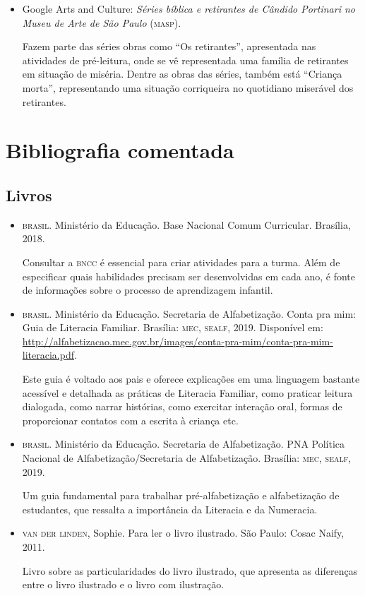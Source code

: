 \documentclass[11pt]{extarticle}
\begin{document}
\begin{itemize}
\item Google Arts and Culture: \textit{Séries bíblica e retirantes de Cândido Portinari no Museu de Arte de São Paulo} (\textsc{masp}).

Fazem parte das séries obras como ``Os retirantes'', apresentada nas atividades de pré-leitura, onde se vê representada
uma família de retirantes em situação de miséria. Dentre as obras das séries, também está ``Criança morta'', representando uma
situação corriqueira no quotidiano miserável dos retirantes. 

\end{itemize}

\section{Bibliografia comentada}

\subsection{Livros}

\begin{itemize}
\item \textsc{brasil}. Ministério da Educação. Base Nacional Comum Curricular. Brasília, 2018.

Consultar a \textsc{bncc} é essencial para criar atividades para a turma. Além de especificar 
quais habilidades precisam ser desenvolvidas em cada ano, é fonte de informações sobre 
o processo de aprendizagem infantil. 

\item \textsc{brasil}. Ministério da Educação. Secretaria de Alfabetização. Conta pra mim: Guia de Literacia Familiar. 
Brasília: \textsc{mec, sealf}, 2019. Disponível em: \url{http://alfabetizacao.mec.gov.br/images/conta-pra-mim/conta-pra-mim-literacia.pdf}.

Este guia é voltado aos pais e oferece explicações em uma linguagem bastante acessível e detalhada as práticas de Literacia Familiar, 
como praticar leitura dialogada, como narrar histórias, como exercitar interação oral, formas de proporcionar contatos com a escrita à criança etc. 
 
\item \textsc{brasil}. Ministério da Educação. Secretaria de Alfabetização. PNA Política Nacional de Alfabetização/Secretaria 
de Alfabetização. Brasília: \textsc{mec, sealf}, 2019.

Um guia fundamental para trabalhar pré-alfabetização e alfabetização de estudantes, que ressalta a importância da Literacia e da Numeracia. 

\item \textsc{van der linden}, Sophie. Para ler o livro ilustrado. São Paulo: Cosac Naify, 2011.

Livro sobre as particularidades do livro ilustrado, que apresenta as diferenças entre o livro ilustrado e o livro com ilustração. 
\end{itemize}
\end{document}
